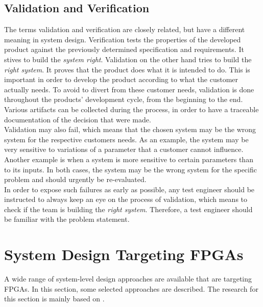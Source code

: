 \subsection{Validation and Verification}
\label{sec:ValidationAndVerification}

The terms validation and verification are closely related, but have a different meaning in system design.
Verification tests the properties of the developed product against the previously determined specification and requirements.
It stives to build the \textit{system right}.
Validation on the other hand tries to build the \textit{right system}.
It proves that the product does what it is intended to do.
This is important in order to develop the product according to what the customer actually needs.
To avoid to divert from these customer needs, validation is done throughout the products' development cycle, from the beginning to the end.
Various artifacts can be collected during the process, in order to have a traceable documentation of the decision that were made.\\

Validation may also fail, which means that the chosen system may be the wrong system for the respective customers needs.
As an example, the system may be very sensitive to variations of a parameter that a customer cannot influence.
Another example is when a system is more sensitive to certain parameters than to its inputs.
In both cases, the system may be the wrong system for the specific problem and should urgently be re-evaluated.\\

In order to expose such failures as early as possible, any test engineer should be instructed to always keep an eye on the process of validation, which means to check if the team is building the \textit{right system}.
Therefore, a test engineer should be familiar with the problem statement.

\section{System Design Targeting FPGAs}

A wide range of system-level design approaches are available that are targeting FPGAs.
In this section, some selected approaches are described.
The research for this section is mainly based on \cite{GesslerRalf2014EES}.

